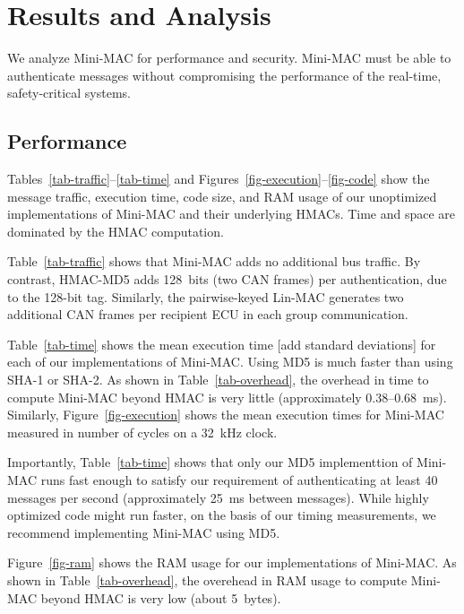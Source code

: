 \section{Results and Analysis}
\label{analysis}

We analyze Mini-MAC for performance and security. 
Mini-MAC must be able to authenticate messages 
without compromising the performance of the real-time, safety-critical systems.

\subsection{Performance}
\label{performance}

Tables~\ref{tab-traffic}--\ref{tab-time} and Figures~\ref{fig-execution}--\ref{fig-code}
show the message traffic, execution time, code size, and RAM usage of our unoptimized implementations
of Mini-MAC and their underlying HMACs.  Time and space are dominated by the HMAC computation.


Table~\ref{tab-traffic} shows that Mini-MAC adds no additional bus traffic.
By contrast, HMAC-MD5 adds 128~bits (two CAN frames) per authentication,
due to the 128-bit tag.  Similarly, the pairwise-keyed Lin-MAC generates
two additional CAN frames per recipient ECU in each group communication.

Table~\ref{tab-time} shows the mean execution time
[add standard deviations] for each of our implementations of Mini-MAC.
Using MD5 is much faster than using SHA-1 or SHA-2.  As shown in Table~\ref{tab-overhead},
the overhead in time to compute Mini-MAC beyond HMAC is very little (approximately 0.38--0.68~ms).
Similarly, Figure~\ref{fig-execution} shows the mean execution times for Mini-MAC measured
in number of cycles on a 32~kHz clock.

Importantly, Table~\ref{tab-time} shows that only our MD5 implementtion of Mini-MAC runs fast enough to satisfy our
requirement of authenticating at least 40 messages per second (approximately
25~ms between messages).   
While highly optimized code might run faster, on the
basis of our timing measurements, we recommend implementing Mini-MAC using MD5.

Figure~\ref{fig-ram} shows the RAM usage for our implementations of Mini-MAC.
As shown in Table~\ref{tab-overhead}, the overehead in RAM usage to compute Mini-MAC
beyond HMAC is very low (about 5~bytes).

